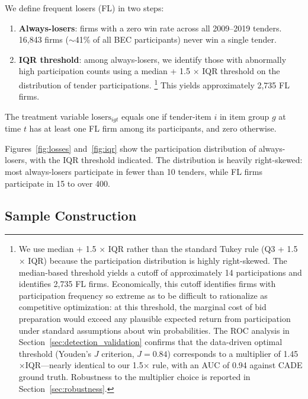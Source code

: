 We define frequent losers (FL) in two steps:

\begin{enumerate}
  \item \textbf{Always-losers}: firms with a zero win rate across all
    2009--2019 tenders. 16,843 firms ($\sim$41\% of all
    BEC participants) never win a single tender.
  \item \textbf{IQR threshold}: among always-losers, we identify those
    with abnormally high participation counts using a median + 1.5
    $\times$ IQR threshold on the distribution of tender participations.%
    \footnote{We use median + 1.5 $\times$ IQR rather than the standard %
    Tukey rule (Q3 + 1.5 $\times$ IQR) because the participation
    distribution is highly right-skewed. The median-based threshold
    yields a cutoff of approximately 14 participations and identifies
    2,735 FL firms. Economically, this cutoff identifies firms with
    participation frequency so extreme as to be difficult to rationalize
    as competitive optimization: at this threshold, the marginal cost
    of bid preparation would exceed any plausible expected return
    from participation under standard assumptions about win
    probabilities. The ROC analysis in Section~\ref{sec:detection_validation}
    confirms that the data-driven optimal threshold (Youden's $J$
    criterion, $J = 0.84$) corresponds to a multiplier of
    1.45$\times$IQR---nearly identical to our 1.5$\times$ rule,
    with an AUC of 0.94 against CADE ground truth.
    Robustness to the multiplier choice is reported in
    Section~\ref{sec:robustness}.}
    This yields approximately 2,735 FL firms.
\end{enumerate}

The treatment variable $\text{losers}_{igt}$ equals one if tender-item
$i$ in item group $g$ at time $t$ has at least one FL firm among its
participants, and zero otherwise.

Figures~\ref{fig:losses} and~\ref{fig:iqr} show the participation
distribution of always-losers, with the IQR threshold indicated. The
distribution is heavily right-skewed: most always-losers participate in
fewer than 10 tenders, while FL firms participate in 15 to over 400.


\subsection{Sample Construction}
\label{sec:sample}

